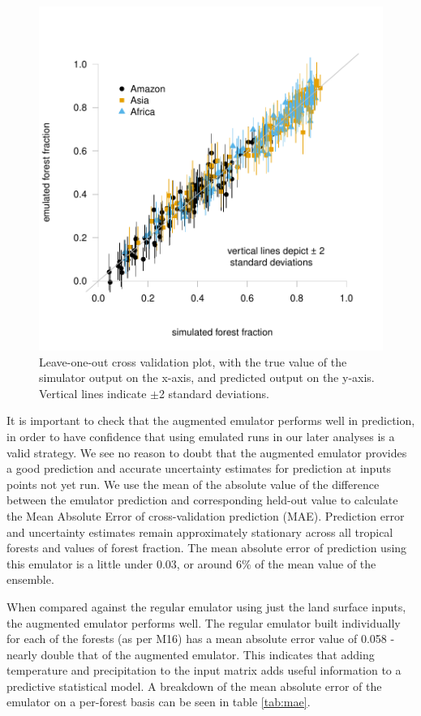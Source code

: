 \documentclass[gmd, manuscript]{copernicus}
\begin{document}
\begin{figure}[t]
\includegraphics[width=12cm]{../graphics/true_loo_all.pdf}
\caption{Leave-one-out cross validation plot, with the true value of the simulator output on the x-axis, and predicted output on the y-axis. Vertical lines indicate $\pm$2 standard deviations.
}
\label{fig:true_loo_all}
\end{figure}

It is important to check that the augmented emulator performs well in prediction, in order to have confidence that using emulated runs in our later analyses is a valid strategy. We see no reason to doubt that the augmented emulator provides a good prediction and accurate uncertainty estimates for prediction at inputs points not yet run. We use the mean of the absolute value of the difference between the emulator prediction and corresponding held-out value to calculate the Mean Absolute Error of cross-validation prediction (MAE). Prediction error and uncertainty estimates remain approximately stationary across all tropical forests and values of forest fraction. The mean absolute error of prediction using this emulator is a little under 0.03, or around 6\% of the mean value of the ensemble.

When compared against the regular emulator using just the land surface inputs, the augmented emulator performs well. The regular emulator built individually for each of the forests (as per M16) has a mean absolute error value of 0.058 - nearly double that of the augmented emulator. This indicates that adding temperature and precipitation to the input matrix adds useful information to a predictive statistical model. A breakdown of the mean absolute error of the emulator on a per-forest basis can be seen in table \ref{tab:mae}.
\end{document}
